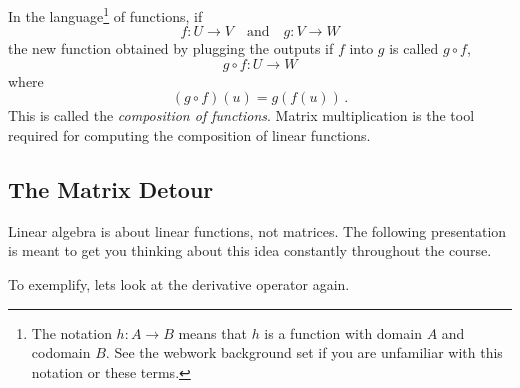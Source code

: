 In the language\footnote{The notation $h:A\to B$ means that $h$ is a function with domain $A$ and codomain $B$. See the webwork  background  set if you are unfamiliar with this notation or these terms.} 
of functions, if $$f:U\longrightarrow V\quad \mbox{and}\quad g:V\longrightarrow W$$
the new function obtained by plugging the outputs if $f$ into $g$ is called $g\circ f$,
$$
g\circ f:
U\longrightarrow  W$$
where
$$
(g\circ f)(u)=g(f(u))\, .
$$
This is called the {\it composition of functions}.
Matrix multiplication is the tool required for computing the composition of linear functions.


\subsection{The Matrix Detour}
Linear algebra is about linear functions, not matrices. 
The following presentation is meant to get you thinking about this idea constantly throughout the course.
\begin{center}
\end{center}
To exemplify, lets look at the derivative operator again.

